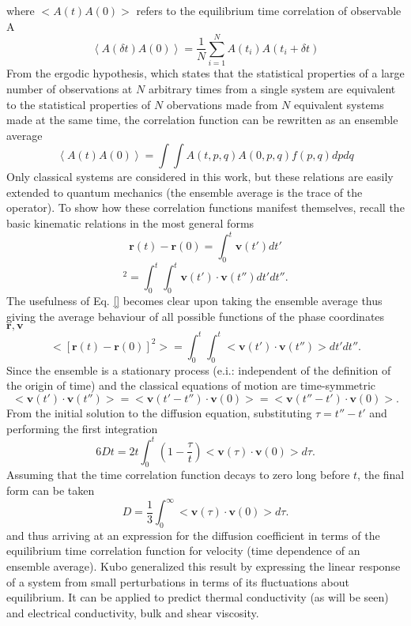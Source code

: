 where $<A(t)A(0)>$ refers to the equilibrium time correlation of observable A
\begin{equation}
\left<A(\delta t)A(0)\right>=\frac{1}{N}\sum_{i=1}^NA(t_i)A(t_i+\delta t) 
\end{equation}
From the ergodic hypothesis, which states that the statistical properties of a large number of observations at $N$ arbitrary times from a single system are equivalent to the statistical properties of $N$ obervations made from $N$ equivalent systems made at the same time, the correlation function can be rewritten as an ensemble average \cite{}
\begin{equation}
\left<A( t)A(0)\right>=\int \int A(t,p,q)A(0,p,q) f(p,q) dpdq 
\end{equation}
Only classical systems are considered in this work, but these relations are easily extended to quantum mechanics (the ensemble average is the trace of the operator). To show how these correlation functions manifest themselves, recall the basic kinematic relations in the most general forms
%
\begin{equation}
\bm{r}(t)-\bm{r}(0)=\int_0^t \bm{v}(t')dt'
\end{equation}
\begin{equation}
[\bm{r}(t)-\bm{r}(0)]^2=\int_0^t \int_0^t \bm{v}(t')\cdot\bm{v}(t'')dt'dt''.
\end{equation}
%
The usefulness of Eq. \ref {} becomes clear upon taking the ensemble average thus giving the average behaviour of all possible functions of the phase coordinates $\bm{r},\bm{v}$
%
\begin{equation}
<[\bm{r}(t)-\bm{r}(0)]^2>=\int_0^t \int_0^t <\bm{v}(t')\cdot\bm{v}(t'')>dt'dt''.
\end{equation}
%
Since the ensemble is a stationary process (e.i.: independent of the definition of the origin of time) and the classical equations of motion are time-symmetric
%
\begin{equation}
<\bm{v}(t')\cdot\bm{v}(t'')>=<\bm{v}(t'-t'')\cdot\bm{v}(0)>=<\bm{v}(t''-t')\cdot\bm{v}(0)>.
\end{equation}
%
From the initial solution to the diffusion equation, substituting $\tau=t''-t'$ and performing the first integration
%
\begin{equation}
6Dt=2t\int_0^t\left(1-\frac{\tau}{t}\right)<\bm{v}(\tau)\cdot\bm{v}(0)>d\tau.
\end{equation}
%
Assuming that the time correlation function decays to zero long before $t$, the final form can be taken
%
\begin{equation}
D=\frac{1}{3}\int_0^{\infty}<\bm{v}(\tau)\cdot\bm{v}(0)>d\tau.
\end{equation}
%
and thus arriving at an expression for the diffusion coefficient in terms of the equilibrium time correlation function for velocity (time dependence of an ensemble average). Kubo generalized this result by expressing the linear response of a system from small perturbations in terms of its fluctuations about equilibrium. It can be applied to predict thermal conductivity (as will be seen)\cite{PhysRevB.61.2651} and electrical conductivity, \cite{zwanzig1965time} bulk and shear viscosity. \cite{hoover1980lennard}

